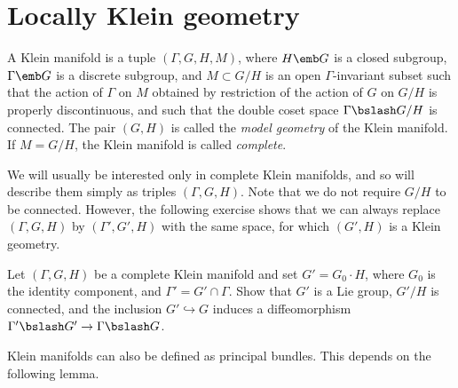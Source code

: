 \section{Locally Klein geometry}\label{sec: locally Klein geom}


\begin{defn}
    A Klein manifold is a tuple $(\Gamma,G,H, M)$, where $H\emb G$ is a closed subgroup, $\Gamma\emb G$ is a discrete subgroup, and $M\subset G\slash H$ is an open $\Gamma$-invariant subset such that the action of $\Gamma$ on $M$ obtained by restriction of the action of $G$ on $G\slash H$ is properly discontinuous, and such that the double coset space $\Gamma\bslash G\slash H$ is connected. The pair $(G,H)$ is called the \emph{model geometry} of the Klein manifold. If $M=G\slash H$, the Klein manifold is called \emph{complete}.
\end{defn}

We will usually be interested only in complete Klein manifolds, and so will describe them simply as triples $(\Gamma,G,H)$. Note that we do not require $G\slash H$ to be connected. However, the following exercise shows that we can always replace $(\Gamma,G,H)$ by $(\Gamma',G',H)$ with the same space, for which $(G',H)$ is a Klein geometry.

\begin{xca}
    Let $(\Gamma,G,H)$ be a complete Klein manifold and set $G'=G_0\cdot H$, where $G_0$ is the identity component, and $\Gamma'=G'\cap \Gamma$. Show that $G'$ is a Lie group, $G'\slash H$ is connected, and the inclusion $G'\hookrightarrow G$ induces a diffeomorphism $\Gamma'\bslash G'\to \Gamma\bslash G$.
\end{xca}

Klein manifolds can also be defined as principal bundles. This depends on the following lemma.

